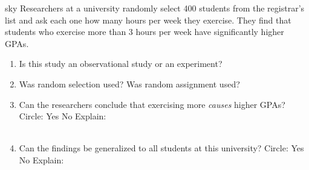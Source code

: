\documentclass[10pt]{article}
\begin{document}
\namedateperiod

\vspace{0.14in}

\begin{scenariobox}[Context]{sky}
\small
Researchers at a university randomly select 400 students from the registrar's list
and ask each one how many hours per week they exercise. They find that students who
exercise more than 3 hours per week have significantly higher GPAs.
\end{scenariobox}

\vspace{0.1in}

\begin{practicebox}
\small
\begin{enumerate}[leftmargin=1.5em, itemsep=10pt]
  \item Is this study an observational study or an experiment? \blank{6cm}

  \item Was random selection used? \blank{3cm} Was random assignment used? \blank{3cm}

  \item Can the researchers conclude that exercising more \emph{causes} higher GPAs?
        Circle: \quad Yes \quad No \quad Explain:\\
        \writeline\\[1pt]\writeline

  \item Can the findings be generalized to all students at this university?
        Circle: \quad Yes \quad No \quad Explain:\\
        \writeline
\end{enumerate}
\end{practicebox}
\end{document}
